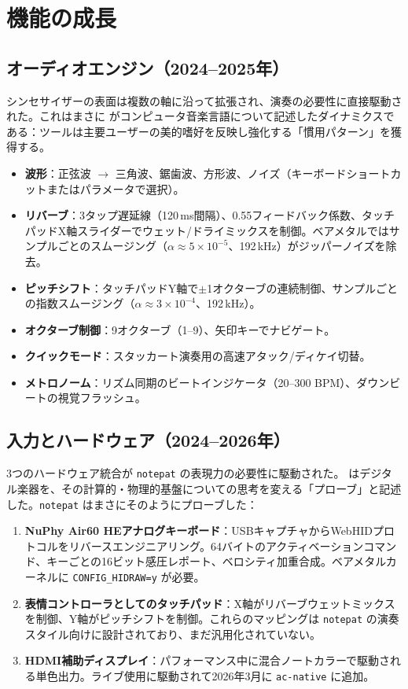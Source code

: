 \documentclass[10pt,letterpaper,twocolumn]{article}
\begin{document}
\section{機能の成長}

\subsection{オーディオエンジン（2024--2025年）}

シンセサイザーの表面は複数の軸に沿って拡張され、演奏の必要性に直接駆動された。これはまさに \citet{mcpherson2020idiomatic} がコンピュータ音楽言語について記述したダイナミクスである：ツールは主要ユーザーの美的嗜好を反映し強化する「慣用パターン」を獲得する。

\begin{itemize}
  \item \textbf{波形}：正弦波 $\rightarrow$ 三角波、鋸歯波、方形波、ノイズ（キーボードショートカットまたはパラメータで選択）。
  \item \textbf{リバーブ}：3タップ遅延線（120\,ms間隔）、0.55フィードバック係数、タッチパッドX軸スライダーでウェット/ドライミックスを制御。ベアメタルではサンプルごとのスムージング（$\alpha \approx 5 \times 10^{-5}$、192\,kHz）がジッパーノイズを除去。
  \item \textbf{ピッチシフト}：タッチパッドY軸で$\pm$1オクターブの連続制御、サンプルごとの指数スムージング（$\alpha \approx 3 \times 10^{-4}$、192\,kHz）。
  \item \textbf{オクターブ制御}：9オクターブ（1--9）、矢印キーでナビゲート。
  \item \textbf{クイックモード}：スタッカート演奏用の高速アタック/ディケイ切替。
  \item \textbf{メトロノーム}：リズム同期のビートインジケータ（20--300 BPM）、ダウンビートの視覚フラッシュ。
\end{itemize}

\subsection{入力とハードウェア（2024--2026年）}

3つのハードウェア統合が \texttt{notepat} の表現力の必要性に駆動された。\citet{tahiroglu2020probes} はデジタル楽器を、その計算的・物理的基盤についての思考を変える「プローブ」と記述した。\texttt{notepat} はまさにそのようにプローブした：

\begin{enumerate}
  \item \textbf{NuPhy Air60 HEアナログキーボード}：USBキャプチャからWebHIDプロトコルをリバースエンジニアリング。64バイトのアクティベーションコマンド、キーごとの16ビット感圧レポート、ベロシティ加重合成。ベアメタルカーネルに \texttt{CONFIG\_HIDRAW=y} が必要。
  \item \textbf{表情コントローラとしてのタッチパッド}：X軸がリバーブウェットミックスを制御、Y軸がピッチシフトを制御。これらのマッピングは \texttt{notepat} の演奏スタイル向けに設計されており、まだ汎用化されていない。
  \item \textbf{HDMI補助ディスプレイ}：パフォーマンス中に混合ノートカラーで駆動される単色出力。ライブ使用に駆動されて2026年3月に \texttt{ac-native} に追加。
\end{enumerate}
\end{document}

